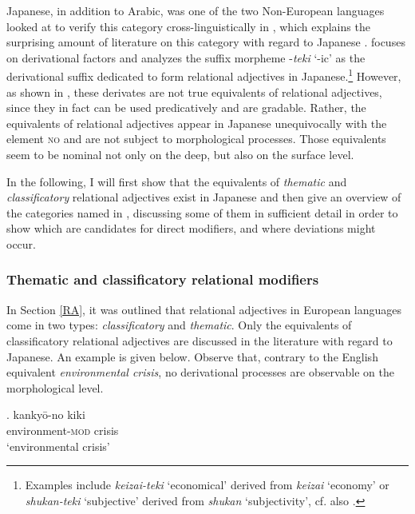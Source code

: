 Japanese, in addition to  Arabic, was one of the two Non-European languages looked at to verify this category cross-linguistically in \citet{bisetto:2010:RA}, which explains the surprising amount of literature on this category with regard to Japanese \citep{nagano:2015:RA, nagano:2016:are, nagano:2018:conversion, shimada:2018:relational, morita:2010:internal, morita:2011:three, morita:2013:morph}. \citet{bisetto:2010:RA} focuses on derivational factors and analyzes the suffix morpheme -\textit{teki}  `-ic' as the derivational suffix dedicated to form relational adjectives in Japanese.\footnote{Examples include \textit{keizai-teki} `economical' derived from \textit{keizai} `economy' or \textit{shukan-teki} `subjective' derived from \textit{shukan} `subjectivity’, cf. also \citet[71–73]{bisetto:2010:RA}.} However, as shown in \citet[48–50]{nagano:2016:are}, these derivates are not true equivalents of relational adjectives, since they in fact can be used predicatively and are gradable. Rather, the equivalents of relational adjectives appear in Japanese unequivocally with the element \textsc{no} and are not subject to morphological processes. Those equivalents seem to be nominal not only on the deep, but also on the surface level.

In the following, I will first show that the equivalents of \textit{thematic} and \textit{classificatory} relational adjectives exist in Japanese and then give an overview of the categories named in \citet{nagano:2016:are}, discussing some of them in sufficient detail in order to show which are candidates for direct modifiers, and where deviations might occur.

\subsubsection{Thematic and classificatory relational modifiers}

In Section \ref{RA}, it was outlined that relational adjectives in European languages come in two types: \textit{classificatory} and \textit{thematic}. Only the equivalents of classificatory relational adjectives are discussed in the literature with regard to Japanese. An example is given below. Observe that, contrary to the English equivalent \textit{environmental crisis}, no derivational processes are observable on the morphological level.

\exg. kankyō-no kiki \\
environment-\textsc{mod} crisis\\
`environmental crisis’

